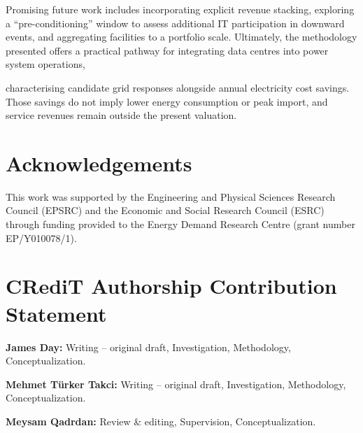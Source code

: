 \documentclass[lettersize,journal]{IEEEtran}
\providecommand{\DIFadd}[1]{{\color{blue}#1}}
\providecommand{\DIFaddbegin}{}
\providecommand{\DIFaddend}{}
\begin{document}
Promising future work includes incorporating explicit revenue stacking, exploring a ``pre-conditioning'' window to  \DIFaddbegin \DIFadd{assess additional }\DIFaddend IT participation in downward events, and aggregating facilities to a portfolio scale. Ultimately, the methodology presented offers a practical pathway for integrating data centres into power system operations,  \DIFaddbegin \DIFadd{characterising candidate grid responses alongside annual electricity cost savings. Those savings do not imply lower energy consumption or peak import, and service revenues remain outside the present valuation.

}\DIFaddend 




\section*{Acknowledgements}

This work was supported by the Engineering and Physical Sciences Research Council (EPSRC) and the Economic and Social Research Council (ESRC) through funding provided to the Energy Demand Research Centre (grant number EP/Y010078/1).

\section*{CRediT Authorship Contribution Statement}

\noindent \textbf{ \DIFaddbegin \DIFadd{James Day}\DIFaddend :} Writing – original draft, Investigation, Methodology, Conceptualization.

\medskip
\noindent \textbf{ \DIFaddbegin \DIFadd{Mehmet Türker Takci:}\DIFaddend } Writing – original draft, Investigation, Methodology, Conceptualization.


\medskip
\noindent \textbf{Meysam Qadrdan:} Review \& editing, Supervision, Conceptualization.
\end{document}
